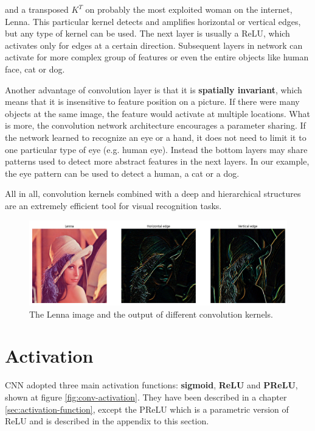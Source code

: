 and a transposed $K^T$ on probably the most exploited woman on the internet, Lenna. This particular kernel detects and amplifies horizontal or vertical edges, but any type of kernel can be used. The next layer is usually a ReLU, which activates only for edges at a certain direction. Subsequent layers in network can activate for more complex group of features or even the entire objects like human face, cat or dog. 

Another advantage of convolution layer is that it is \textbf{spatially invariant}, which means that it is insensitive to feature position on a picture. If there were many objects at the same image, the feature would activate at multiple locations. What is more, the convolution network architecture encourages a parameter sharing. If the network learned to recognize an eye or a hand, it does not need to limit it to one particular type of eye (e.g. human eye). Instead the bottom layers may share patterns used to detect more abstract features in the next layers. In our example, the eye pattern can be used to detect a human, a cat or a dog.

All in all, convolution kernels combined with a deep and hierarchical structures are an extremely efficient tool for visual recognition tasks.

\begin{figure}[h]
    \centering
    \includegraphics[width=16cm]{img/Lenna1.png}
    \caption{The Lenna image and the output of different convolution kernels.}
    \label{fig:conv-lenna}
\end{figure}

\section{Activation}
\label{sec:conv-activation}

CNN adopted three main activation functions: \textbf{sigmoid}, \textbf{ReLU} and \textbf{PReLU}, shown at figure \ref{fig:conv-activation}. They have been described in a chapter \ref{sec:activation-function}, except the PReLU which is a parametric version of ReLU and is described in the appendix to this section.

